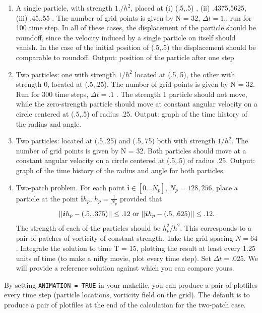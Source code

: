 \documentclass[11pt]{article}
\begin{document}
\begin{enumerate}
    \item
          A single particle, with strength $1./h^2$, placed at (i) (.5,.5) , (ii) .4375,5625, (iii) .45,.55 . The number of grid points is given by N = 32, $\Delta t = 1.$; run for 100 time step.
          In all of these cases, the displacement of the particle should be roundoff, since the velocity induced by a single particle on itself should vanish. In the case of the initial position of (.5,.5) the displacement should be comparable to roundoff. Output: position of the particle after one step
    \item
          Two particles: one with strength $1/h^2$ located at (.5,.5), the other with strength 0, located at (.5,.25). The number of grid points is given by N = 32. Run for 300 time steps, $\Delta t = .1$ . The strength 1 particle should not move, while the zero-strength particle should move at constant angular velocity on a circle centered at (.5,.5) of radius .25. Output: graph of the time history of the radius and angle.
    \item
          Two particles: located at (.5,.25) and (.5,.75) both with strength $1/h^2$. The number of grid points is given by N = 32. Both particles should move at a  constant angular velocity on a circle centered at (.5,.5) of radius .25. Output: graph of the time history of the radius and angle for both particles.
    \item
          Two-patch problem. For each point
          $ \boldsymbol{i}\in [0 \dots N_p]$, $N_p = 128, 256$, place a particle at the point $\boldsymbol{i} h_p$, $h_p = \frac{1}{N_p}$ provided that
          \begin{gather*}
              || \boldsymbol{i}h_p - (.5,.375) || \leq .12 \hbox { or } || \boldsymbol{i} h_p - (.5,.625) || \leq .12 .
          \end{gather*}
          The strength of each of the particles should be $h_p^2/h^2$. This corresponds to a pair of patches of vorticity of constant strength. Take the grid spacing $N = 64$. Integrate the solution to time T = 15, plotting the result at least every 1.25 units of time (to make a nifty movie, plot every time step). Set $\Delta t = .025$. We will provide a reference solution against which you can compare yours.
\end{enumerate}
By setting {\tt ANIMATION = TRUE} in your makefile, you can produce a pair of plotfiles every time step (particle locations, vorticity field on the grid). The default is to produce a pair of plotfiles at the end of the calculation for the two-patch case.
\end{document}
